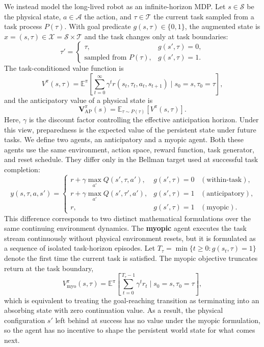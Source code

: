 \documentclass{article}
\begin{document}
We instead model the long-lived robot as an infinite-horizon MDP. Let $s \in \mathcal{S}$ be the physical state, $a \in \mathcal{A}$ the action, and $\tau \in \mathcal{T}$ the current task sampled from a task process $P(\tau)$. With goal predicate $g(s,\tau)\in\{0,1\}$, the augmented state is $x=(s,\tau)\in\mathcal{X}=\mathcal{S}\times\mathcal{T}$ and the task changes only at task boundaries:
\begin{equation}
\label{eq:task-transition}
\tau'=
\begin{cases}
\tau, & g(s',\tau)=0,\\
\text{sampled from } P(\tau), & g(s',\tau)=1.
\end{cases}
\end{equation}
The task-conditioned value function is
\begin{equation}
\label{eq:value}
V^\pi(s,\tau)=\mathbb{E}^\pi\!\left[\sum_{t=0}^{\infty}\gamma^t r(s_t,\tau_t,a_t,s_{t+1}) \mid s_0=s,\tau_0=\tau\right],
\end{equation}
and the anticipatory value of a physical state is
\begin{equation}
\label{eq:ap-value}
\mathbf{V}_{\mathrm{AP}}^\pi(s)=\mathbb{E}_{\tau \sim P(\tau)}[V^\pi(s,\tau)].
\end{equation}
Here, $\gamma$ is the discount factor controlling the effective anticipation horizon. Under this view, preparedness is the expected value of the persistent state under future tasks.
We define two agents, an anticipatory and a myopic agent. Both these agents use the same environment, action space, reward function, task generator, and reset schedule. They differ only in the Bellman target used at successful task completion:
\begin{equation}
\label{eq:targets}
\;y(s,\tau,a,s')=
\begin{cases}
r+\gamma \max_{a'}Q(s',\tau,a'), & g(s',\tau)=0 \;\;\;(\text{within-task}),\\
r+\gamma \max_{a'}Q(s',\tau',a'), & g(s',\tau)=1 \;\;\;(\text{anticipatory}),\\
r, & g(s',\tau)=1 \;\;\;(\text{myopic}).
\end{cases}
\end{equation}
This difference corresponds to two distinct mathematical formulations over the same continuing environment dynamics. The \textbf{myopic} agent executes the task stream continuously without physical environment resets, but it is formulated as a sequence of isolated task-horizon episodes. Let $T_\tau=\min\{t \ge 0: g(s_t,\tau)=1\}$ denote the first time the current task is satisfied. The myopic objective truncates return at the task boundary,
\begin{equation}
\label{eq:myopic-episodic}
V_{\mathrm{myo}}^\pi(s,\tau)=\mathbb{E}^\pi\!\left[\sum_{t=0}^{T_\tau-1}\gamma^t r_t \mid s_0=s,\tau_0=\tau\right],
\end{equation}
which is equivalent to treating the goal-reaching transition as terminating into an absorbing state with zero continuation value. As a result, the physical configuration $s'$ left behind at success has no value under the myopic formulation, so the agent has no incentive to shape the persistent world state for what comes next.
\end{document}
